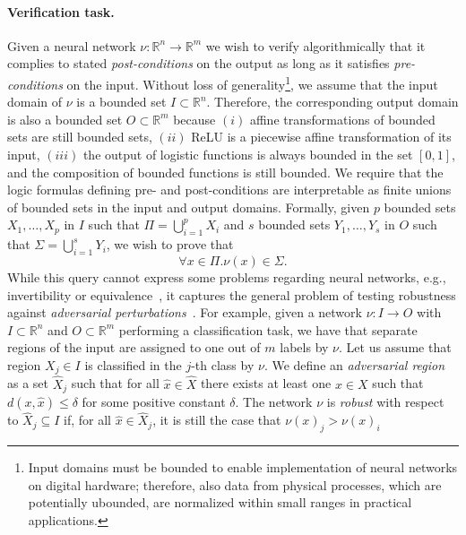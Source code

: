 \paragraph{Verification task.} Given a neural network $\nu :
\mathbb{R}^n \to \mathbb{R}^m$ we wish to verify algorithmically that
it complies to stated \emph{post-conditions} on the output as long as
it satisfies \emph{pre-conditions} on the input. Without loss of
generality\footnote{Input domains must be bounded to enable
	implementation of neural networks on digital hardware; therefore,
	also data from physical processes, which are potentially ubounded,
	are normalized within small ranges in practical applications.},
we assume that the input domain of $\nu$ is a bounded set $I 
\subset \mathbb{R}^n$. Therefore, the corresponding output domain is 
also a bounded set $O \subset \mathbb{R}^m$ because $(i)$ affine
transformations of bounded sets are still bounded sets, $(ii)$ ReLU is a
piecewise affine transformation of its input, $(iii)$ the output
of logistic functions is always bounded in the set $[0,1]$, and the
composition of bounded functions is still bounded. We
require that the logic formulas defining pre- and post-conditions are
interpretable as finite unions of bounded sets in the input 
and output domains. Formally, given $p$ bounded sets $X_1, \ldots,
X_p$ in $I$ such that $\Pi = \bigcup_{i=1}^p X_i$ and $s$ bounded
sets $Y_1, \ldots, Y_s$ in $O$ such that $\Sigma =
\bigcup_{i=1}^s Y_i$, we wish to prove that  
\begin{equation}
	\label{eq:verif}
	\forall x \in \Pi. \nu(x) \in \Sigma.
\end{equation}
While this query cannot express some problems regarding
neural networks, e.g., invertibility or
equivalence~\cite{DBLP:journals/corr/abs-1805-09938}, it captures the
general problem of testing robustness against \emph{adversarial
	perturbations}~\cite{DBLP:journals/corr/GoodfellowSS14}. For example,
given a network $\nu : I \to O$ with $I \subset \mathbb{R}^n$ and
$O \subset \mathbb{R}^m$ performing a 
classification task, we have that separate regions of the input are 
assigned to one out of $m$ labels by $\nu$. Let us assume
that region $X_j \in I$ is classified in the $j$-th class
by $\nu$. We define an \emph{adversarial region} as a
set $\hat{X}_j$ such that for all $\hat{x} \in \hat{X}$ there exists at
least one $x \in X$ such that $d(x,\hat{x}) \leq \delta$ for some
positive constant $\delta$. The 
network $\nu$ is \emph{robust} with respect to $\hat{X}_j \subseteq I$ if,
for all $\hat{x} \in \hat{X}_j$, it is still the case that $\nu(x)_j > \nu(x)_i$
